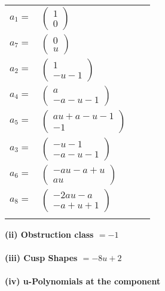 \documentclass[1p]{elsarticle_modified}
\theoremstyle{definition}
\begin{document}
\begin{tabular}{m{7pt} m{180pt} m{7pt} m{180pt} }
\flushright $a_{1}=$&$\begin{pmatrix}1\\0\end{pmatrix}$ \\
\flushright $a_{7}=$&$\begin{pmatrix}0\\u\end{pmatrix}$ \\
\flushright $a_{2}=$&$\begin{pmatrix}1\\- u-1\end{pmatrix}$ \\
\flushright $a_{4}=$&$\begin{pmatrix}a\\- a- u-1\end{pmatrix}$ \\
\flushright $a_{5}=$&$\begin{pmatrix}a u+a- u-1\\-1\end{pmatrix}$ \\
\flushright $a_{3}=$&$\begin{pmatrix}- u-1\\- a- u-1\end{pmatrix}$ \\
\flushright $a_{6}=$&$\begin{pmatrix}- a u- a+u\\a u\end{pmatrix}$ \\
\flushright $a_{8}=$&$\begin{pmatrix}-2 a u- a\\- a+u+1\end{pmatrix}$\\&\end{tabular}
\flushleft \textbf{(ii) Obstruction class $= -1$}\\~\\
\flushleft \textbf{(iii) Cusp Shapes $= -8 u+2$}\\~\\
\newpage\renewcommand{\arraystretch}{1}
\flushleft \textbf{(iv) u-Polynomials at the component}\newline \\
\end{document}
